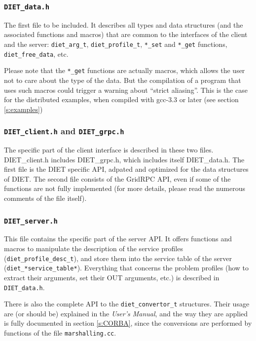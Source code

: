   \subsubsection{\tt DIET\_data.h}

  The first file to be included. It describes all types and data structures (and
      the associated functions and macros) that are common to the interfaces of the
  client and the server: \verb+diet_arg_t+, \verb+diet_profile_t+, \verb+*_set+
  and \verb+*_get+ functions, \verb+diet_free_data+, etc.

  Please note that the \verb+*_get+ functions are actually macros, which allows
  the user not to care about the type of the data. But the compilation of a
  program that uses such macros could trigger a warning about ``strict aliasing''.
  This is the case for the distributed examples, when compiled with
\textsf{gcc-3.3} or later (see section \ref{s:examples})


  \subsubsection{{\tt DIET\_client.h} and {\tt DIET\_grpc.h}}

  The specific part of the client interface is described in these two files.
  \textsf{DIET\_client.h} includes \textsf{DIET\_grpc.h}, which includes itself
  \textsf{DIET\_data.h}.
  The first file is the DIET specific API, adpated and optimized for the data
  structures of DIET. The second file consists of the GridRPC API, even if some of
  the functions are not fully implemented (for more details, please read the
      numerous comments of the file itself).


  \subsubsection{\tt DIET\_server.h}

  This file contains the specific part of the server API.
  It offers functions and macros to manipulate the description of the service
  profiles (\verb+diet_profile_desc_t+), and store them into the service table of
  the server (\verb+diet_*service_table*+). Everything that concerns the problem
  profiles (how to extract their arguments, set their OUT arguments, etc.) is
  described in \texttt{DIET\_data.h}.


  There is also the complete API to the \texttt{diet\_convertor\_t} structures.
  Their usage are (or should be) explained in the \textit{User's Manual}, and the
  way they are applied is fully documented in section \ref{s:CORBA}, since the
  conversions are performed by functions of the file \texttt{marshalling.cc}.


